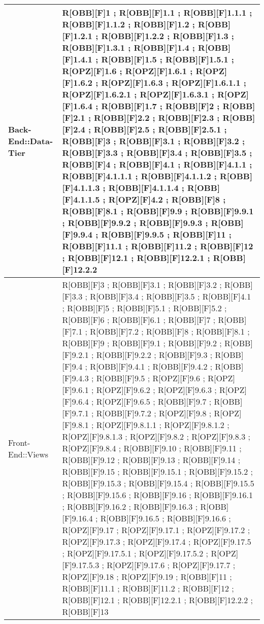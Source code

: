 	\begin{table}[h]
		\centering
		\begin{tabular}{|p{}|p{}|}
			\midrule

			Back-End::Data-Tier & R[OBB][F]1 ; R[OBB][F]1.1 ; R[OBB][F]1.1.1 ; R[OBB][F]1.1.2 ; R[OBB][F]1.2 ; R[OBB][F]1.2.1 ; R[OBB][F]1.2.2 ; R[OBB][F]1.3 ; R[OBB][F]1.3.1 ; R[OBB][F]1.4 ; R[OBB][F]1.4.1 ; R[OBB][F]1.5 ; R[OBB][F]1.5.1 ; R[OPZ][F]1.6 ; R[OPZ][F]1.6.1 ; R[OPZ][F]1.6.2 ; R[OPZ][F]1.6.3 ; R[OPZ][F]1.6.1.1 ; R[OPZ][F]1.6.2.1 ; R[OPZ][F]1.6.3.1 ; R[OPZ][F]1.6.4 ; R[OBB][F]1.7 ; R[OBB][F]2 ; R[OBB][F]2.1 ; R[OBB][F]2.2 ; R[OBB][F]2.3 ; R[OBB][F]2.4 ; R[OBB][F]2.5 ; R[OBB][F]2.5.1 ; R[OBB][F]3 ; R[OBB][F]3.1 ; R[OBB][F]3.2 ; R[OBB][F]3.3 ; R[OBB][F]3.4 ; R[OBB][F]3.5 ; R[OBB][F]4 ; R[OBB][F]4.1 ; R[OBB][F]4.1.1 ; R[OBB][F]4.1.1.1 ; R[OBB][F]4.1.1.2 ; R[OBB][F]4.1.1.3 ; R[OBB][F]4.1.1.4 ; R[OBB][F]4.1.1.5 ; R[OPZ][F]4.2 ; R[OBB][F]8 ; R[OBB][F]8.1 ; R[OBB][F]9.9 ; R[OBB][F]9.9.1 ; R[OBB][F]9.9.2 ; R[OBB][F]9.9.3 ; R[OBB][F]9.9.4 ; R[OBB][F]9.9.5 ; R[OBB][F]11 ; R[OBB][F]11.1 ; R[OBB][F]11.2 ; R[OBB][F]12 ; R[OBB][F]12.1 ; R[OBB][F]12.2.1 ; R[OBB][F]12.2.2 \\ \midrule
			Front-End::Views & R[OBB][F]3 ; R[OBB][F]3.1 ; R[OBB][F]3.2 ; R[OBB][F]3.3 ; R[OBB][F]3.4 ; R[OBB][F]3.5 ; R[OBB][F]4.1 ; R[OBB][F]5 ; R[OBB][F]5.1 ; R[OBB][F]5.2 ; R[OBB][F]6 ; R[OBB][F]6.1 ; R[OBB][F]7 ; R[OBB][F]7.1 ; R[OBB][F]7.2 ; R[OBB][F]8 ; R[OBB][F]8.1 ; R[OBB][F]9 ; R[OBB][F]9.1 ; R[OBB][F]9.2 ; R[OBB][F]9.2.1 ; R[OBB][F]9.2.2 ; R[OBB][F]9.3 ; R[OBB][F]9.4 ; R[OBB][F]9.4.1 ; R[OBB][F]9.4.2 ; R[OBB][F]9.4.3 ; R[OBB][F]9.5 ; R[OPZ][F]9.6 ; R[OPZ][F]9.6.1 ; R[OPZ][F]9.6.2 ; R[OPZ][F]9.6.3 ; R[OPZ][F]9.6.4 ; R[OPZ][F]9.6.5 ; R[OBB][F]9.7 ; R[OBB][F]9.7.1 ; R[OBB][F]9.7.2 ; R[OPZ][F]9.8 ; R[OPZ][F]9.8.1 ; R[OPZ][F]9.8.1.1 ; R[OPZ][F]9.8.1.2 ; R[OPZ][F]9.8.1.3 ; R[OPZ][F]9.8.2 ; R[OPZ][F]9.8.3 ; R[OPZ][F]9.8.4 ; R[OBB][F]9.10 ; R[OBB][F]9.11 ; R[OBB][F]9.12 ; R[OBB][F]9.13 ; R[OBB][F]9.14 ; R[OBB][F]9.15 ; R[OBB][F]9.15.1 ; R[OBB][F]9.15.2 ; R[OBB][F]9.15.3 ; R[OBB][F]9.15.4 ; R[OBB][F]9.15.5 ; R[OBB][F]9.15.6 ; R[OBB][F]9.16 ; R[OBB][F]9.16.1 ; R[OBB][F]9.16.2 ; R[OBB][F]9.16.3 ; R[OBB][F]9.16.4 ; R[OBB][F]9.16.5 ; R[OBB][F]9.16.6 ; R[OPZ][F]9.17 ; R[OPZ][F]9.17.1 ; R[OPZ][F]9.17.2 ; R[OPZ][F]9.17.3 ; R[OPZ][F]9.17.4 ; R[OPZ][F]9.17.5 ; R[OPZ][F]9.17.5.1 ; R[OPZ][F]9.17.5.2 ; R[OPZ][F]9.17.5.3 ; R[OPZ][F]9.17.6 ; R[OPZ][F]9.17.7 ; R[OPZ][F]9.18 ; R[OPZ][F]9.19 ; R[OBB][F]11 ; R[OBB][F]11.1 ; R[OBB][F]11.2 ; R[OBB][F]12 ; R[OBB][F]12.1 ; R[OBB][F]12.2.1 ; R[OBB][F]12.2.2 ; R[OBB][F]13 \\ \midrule

		\end{tabular}
	\end{table}
	\newpage
	
